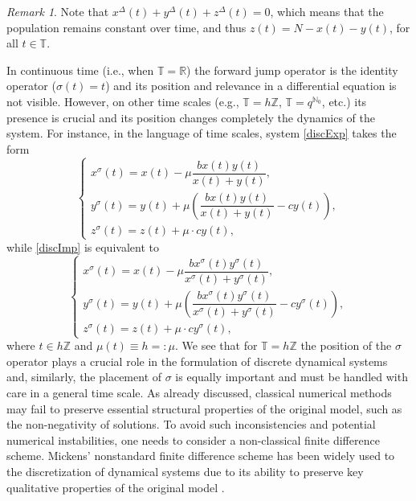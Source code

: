 \documentclass[pdflatex,sn-mathphys-num]{sn-jnl}
\theoremstyle{remark}
\newtheorem{remark}{Remark}
\begin{document}
\begin{remark}
\label{rem:constant:t}
Note that 
$x^\Delta(t) + y^\Delta(t) + z^\Delta(t) = 0$, which means that the 
population remains constant over time, and thus $z(t) = N - x(t) - y(t)$, 
for all $t \in \mathbb{T}$. 
\end{remark}

In continuous time (i.e., when $\mathbb{T}=\mathbb{R}$) the forward jump operator is the 
identity operator ($\sigma(t) = t$) and its position and relevance in a differential equation 
is not visible. However, on other time scales (e.g., $\mathbb{T}=h\mathbb{Z}$, 
$\mathbb{T}=q^{\mathbb{N}_0}$, etc.) its presence is crucial 
and its position changes completely the dynamics of the system. 
For instance, in the language of time scales, 
system \eqref{discExp} takes the form
\begin{equation}
\label{discExp2}	
\begin{cases}
x^\sigma(t) = x(t) - \mu \dfrac{b x(t) y(t)}{x(t) + y(t)}, \\[10pt]
y^\sigma(t) = y(t) + \mu  \left( \dfrac{b x(t) y(t)}{x(t) + y(t)} - c y(t) \right), \\[10pt]
z^\sigma(t) = z(t) + \mu  \cdot c y(t),
\end{cases}
\end{equation}
while \eqref{discImp} is equivalent to	
\begin{equation}
\label{discImp2}	
\begin{cases}
x^\sigma(t) = x(t) - \mu \dfrac{b x^\sigma(t) y^\sigma(t)}{x^\sigma(t) + y^\sigma(t)}, \\[10pt]
y^\sigma(t) = y(t) + \mu \left( \dfrac{b x^\sigma(t) y^\sigma(t)}{x^\sigma(t) + y^\sigma(t)} - c y^\sigma(t) \right), \\[10pt]
z^\sigma(t) = z(t) + \mu \cdot c y^\sigma(t),
\end{cases}
\end{equation}
where $t \in h\mathbb{Z}$ and $\mu(t) \equiv h =: \mu$. 
We see that for $\mathbb{T} = h\mathbb{Z}$ the position 
of the $\sigma$ operator plays a crucial role in the formulation of discrete dynamical systems
and, similarly, the placement of $\sigma$ is equally important and 
must be handled with care in a general time scale. As already discussed, 
classical numerical methods may fail to preserve essential
structural properties of the original model, such as the non-negativity of solutions. 
To avoid such inconsistencies and potential numerical instabilities, one needs to consider 
a non-classical finite difference scheme. Mickens' nonstandard finite difference scheme has 
been widely used to the discretization of dynamical systems due to its ability to preserve key 
qualitative properties of the original model \cite{sir:discrete,MR4276109}. 
\end{document}

